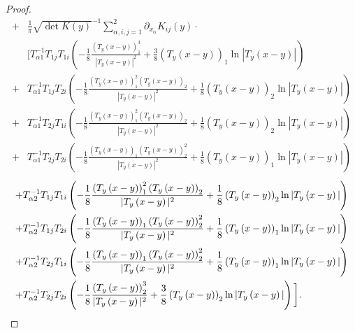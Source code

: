 \documentclass[12pt,reqno]{amsart}
\numberwithin{equation}{section}
\theoremstyle{definition}
\theoremstyle{remark}
\begin{document}
\begin{proof}
\begin{equation*}
\begin{split}
	+&\frac{1}{\pi}\sqrt{\det K(y)}^{-1} \sum_{\alpha,i,j=1}^2\partial_{x_\alpha}K_{ij}(y)\cdot \\
	&\bigg[T^{-1}_{\alpha1}T_{1j}T_{1i}\left( -\frac{1}{8}\frac{\left( T_y\left (x-y\right )\right) _1^3}{|T_y\left (x-y\right )|^2}+\frac{3}{8}\left( T_y\left (x-y\right )\right)_1\ln|T_y\left (x-y\right )|\right) \\
	+&T^{-1}_{\alpha1}T_{1j}T_{2i}\left( -\frac{1}{8}\frac{\left( T_y\left (x-y\right )\right) _1^2\left( T_y\left (x-y\right )\right) _2}{|T_y\left (x-y\right )|^2}+\frac{1}{8}\left( T_y\left (x-y\right )\right)_2\ln|T_y\left (x-y\right )|\right) \\
	+&T^{-1}_{\alpha1}T_{2j}T_{1i}\left( -\frac{1}{8}\frac{\left( T_y\left (x-y\right )\right) _1^2\left( T_y\left (x-y\right )\right) _2}{|T_y\left (x-y\right )|^2}+\frac{1}{8}\left( T_y\left (x-y\right )\right)_2\ln|T_y\left (x-y\right )|\right)\\
	+&T^{-1}_{\alpha1}T_{2j}T_{2i}\left( -\frac{1}{8}\frac{\left( T_y\left (x-y\right )\right) _1\left( T_y\left (x-y\right )\right) _2^2}{|T_y\left (x-y\right )|^2}+\frac{1}{8}\left( T_y\left (x-y\right )\right)_1\ln|T_y\left (x-y\right )|\right)
	\end{split}
	\end{equation*}
	\begin{equation}\label{F_{2,y}}
	\begin{split}
	+&T^{-1}_{\alpha2}T_{1j}T_{1i}\left( -\frac{1}{8}\frac{\left( T_y\left (x-y\right )\right) _1^2\left( T_y\left (x-y\right )\right) _2}{|T_y\left (x-y\right )|^2}+\frac{1}{8}\left( T_y\left (x-y\right )\right)_2\ln|T_y\left (x-y\right )|\right)\\
	+&T^{-1}_{\alpha2}T_{1j}T_{2i}\left( -\frac{1}{8}\frac{\left( T_y\left (x-y\right )\right) _1\left( T_y\left (x-y\right )\right) _2^2}{|T_y\left (x-y\right )|^2}+\frac{1}{8}\left( T_y\left (x-y\right )\right)_1\ln|T_y\left (x-y\right )|\right)\\
	+&T^{-1}_{\alpha2}T_{2j}T_{1i}\left( -\frac{1}{8}\frac{\left( T_y\left (x-y\right )\right) _1\left( T_y\left (x-y\right )\right) _2^2}{|T_y\left (x-y\right )|^2}+\frac{1}{8}\left( T_y\left (x-y\right )\right)_1\ln|T_y\left (x-y\right )|\right)\\
	+&T^{-1}_{\alpha2}T_{2j}T_{2i}\left( -\frac{1}{8}\frac{\left( T_y\left (x-y\right )\right) _2^3 }{|T_y\left (x-y\right )|^2}+\frac{3}{8}\left( T_y\left (x-y\right )\right)_2\ln|T_y\left (x-y\right )|\right)\bigg].
	\end{split}
	\end{equation}

\end{proof}
\end{document}

